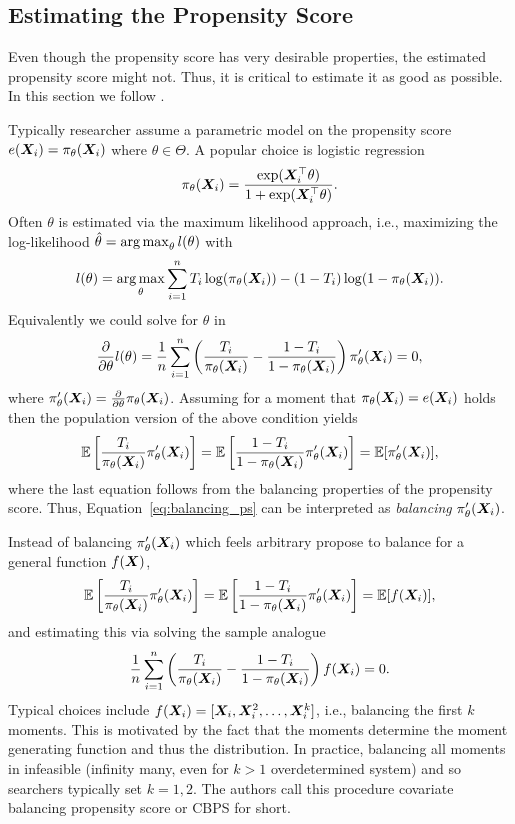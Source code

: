 \documentclass[11pt]{exam}
\begin{document}
\subsection{Estimating the Propensity Score}
Even though the propensity score has very desirable properties, the estimated propensity score might not. Thus, it is critical to estimate it as good as possible. In this section we follow \cite{imai2014covariate}.

Typically researcher assume a parametric model on the propensity score $e(\bm{X}_i) = \pi_\theta(\bm{X}_i)$ where $\theta \in \Theta$. A popular choice is logistic regression
\[
    \pi_\theta(\bm{X}_i) = \frac{\exp(\bm{X}_i^\top \theta)}{1 + \exp(\bm{X}_i^\top \theta)}.
\]
Often $\theta$ is estimated via the maximum likelihood approach, i.e., maximizing the log-likelihood $\hat \theta = \operatorname*{arg\,max}_{\theta} l(\theta)$ with
\[
    l(\theta) = \operatorname*{arg\,max}_{\theta} \sum_{i=1}^n T_i \log(\pi_\theta(\bm{X}_i)) - (1 - T_i) \log(1 - \pi_\theta(\bm{X}_i)).
\]
Equivalently we could solve for $\theta$ in
\begin{equation}\label{eq:balancing_ps}
    \frac{\partial}{\partial \theta} l(\theta) = \frac{1}{n} \sum_{i=1}^n \left(\frac{T_i}{\pi_\theta(\bm{X}_i)} - \frac{1 - T_i}{1 - \pi_\theta(\bm{X}_i)} \right) \pi_\theta^\prime(\bm{X}_i) = 0,
\end{equation}
where $\pi_\theta^\prime(\bm{X}_i) = \frac{\partial}{\partial \theta} \pi_\theta(\bm{X}_i)$. Assuming for a moment that $\pi_\theta(\bm{X}_i) = e(\bm{X}_i)$ holds then the population version of the above condition yields
\[
    \mathbb{E}\left[\frac{T_i}{\pi_\theta(\bm{X}_i)}  \pi_\theta^\prime(\bm{X}_i)\right] = \mathbb{E}\left[\frac{1 - T_i}{1 - \pi_\theta(\bm{X}_i)} \pi_\theta^\prime(\bm{X}_i) \right] = \mathbb{E}[\pi_\theta^\prime(\bm{X}_i)],
\]
where the last equation follows from the balancing properties of the propensity score. Thus, Equation~\eqref{eq:balancing_ps} can be interpreted as \emph{balancing} $\pi_\theta^\prime(\bm{X}_i)$.

Instead of balancing $\pi_\theta^\prime(\bm{X}_i)$ which feels arbitrary \citet{imai2014covariate} propose to balance for a general function $f(\bm{X})$,
\[
 \mathbb{E}\left[\frac{T_i}{\pi_\theta(\bm{X}_i)}  \pi_\theta^\prime(\bm{X}_i)\right] = \mathbb{E}\left[\frac{1 - T_i}{1 - \pi_\theta(\bm{X}_i)} \pi_\theta^\prime(\bm{X}_i) \right] = \mathbb{E}[f(\bm{X}_i)],   
\]
and estimating this via solving the sample analogue
\[
    \frac{1}{n} \sum_{i=1}^n \left(\frac{T_i}{\pi_\theta(\bm{X}_i)} - \frac{1 - T_i}{1 - \pi_\theta(\bm{X}_i)} \right) f(\bm{X}_i) = 0.
\]
Typical choices include $f(\bm{X}_i) = [\bm{X}_i, \bm{X}_i^2, \ldots, \bm{X}_i^k]$, i.e., balancing the first $k$ moments. This is motivated by the fact that the moments determine the moment generating function and thus the distribution. In practice, balancing all moments in infeasible (infinity many, even for $k > 1$ overdetermined system) and so searchers typically set $k=1, 2$. The authors call this procedure covariate balancing propensity score or CBPS for short.
\end{document}
